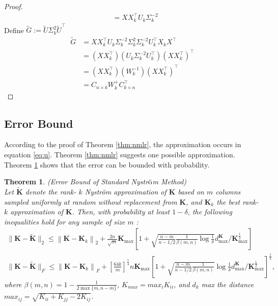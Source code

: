 \documentclass[12pt, a4paper, oneside]{article}
\newtheorem{theorem}{Theorem}
\newcommand{\nysm}{Nystr$\ddot{\rm o}$m Method}
\begin{document}
\begin{proof}
\begin{equation}
\begin{aligned}
		&=X X_{k}^{\top} U_{k} \Sigma_{k}^{-2}
	\end{aligned}
\end{equation}
Define $\tilde{G}:=\tilde{U} \Sigma_{k}^{2} \tilde{U}^{\top}$
\begin{equation}
	\begin{aligned}
		\tilde{G} &=X X_{k}^{\top} U_{k} \Sigma_{k}^{-2} \Sigma_{k}^{2} \Sigma_{k}^{-2} U_{k}^{\top} X_{k} X^{\top} \\
		&=\left(X X_{k}^{\top}\right)\left(U_{k} \Sigma_{k}^{-2} U_{k}^{\top}\right)\left(X X_{k}^{\top}\right)^{\top} \\
		&=\left(X X_{k}^{\top}\right)\left(W_{k}^{-1}\right)\left(X X_{k}^{\top}\right)^{\top} \\
		&=C_{n \times k} W_{k}^{+} C_{k \times n}^{\top}
	\end{aligned}
\end{equation}
\end{proof}

\subsection{Error Bound}
\label{subsec:eb}

According to the proof of Theorem \ref{thm:nmlr}, the approximation occurs in equation \ref{eq:u}. Theorem \ref{thm:nmlr} suggests one possible approximation. Theorem \ref{thm:eb} shows that the error can be bounded with probability. 

\begin{theorem} 
	\label{thm:eb}
	(Error Bound of Standard \nysm) \\
	Let $\widetilde{\mathbf{K}}$ denote the rank- $k$ Nyström approximation of $\mathbf{K}$ based on $m$ columns sampled uniformly at random without replacement from $\mathbf{K}$, and $\mathbf{K}_{k}$ the best rank- $k$ approximation of $\mathbf{K}$. Then, with probability at least $1-\delta$, the following inequalities hold for any sample of size $m$ :
	$$
	\begin{gathered}
		\|\mathbf{K}-\widetilde{\mathbf{K}}\|_{2} \leq\left\|\mathbf{K}-\mathbf{K}_{k}\right\|_{2}+\frac{2 n}{\sqrt{m}} \mathbf{K}_{\max }\left[1+\sqrt{\frac{n-m}{n-1 / 2} \frac{1}{\beta(m, n)} \log \frac{1}{\delta}} d_{\max }^{\mathbf{K}} / \mathbf{K}_{\max }^{\frac{1}{2}}\right] \\
		\|\mathbf{K}-\widetilde{\mathbf{K}}\|_{F} \leq\left\|\mathbf{K}-\mathbf{K}_{k}\right\|_{F}+\left[\frac{64 k}{m}\right]^{\frac{1}{4}} n \mathbf{K}_{\max }\left[1+\sqrt{\frac{n-m}{n-1 / 2} \frac{1}{\beta(m, n)}} \log \frac{1}{\delta} d_{\max }^{\mathbf{K}} / \mathbf{K}_{\max }^{\frac{1}{2}}\right]^{\frac{1}{2}},
	\end{gathered}
	$$
	where $\beta(m, n)=1-\frac{1}{2 \max \{m, n-m\}}$, $K_{max} = max_i K_{ii}$, and $d_k$ max the distance $max_{ij} = \sqrt{K_{ii}+K_{jj}-2K_{ij}}$.
\end{theorem}
\end{document}
